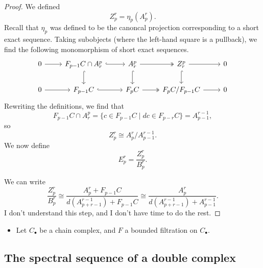 \documentclass[main.tex]{subfiles}
\begin{document}
\begin{proof}
  We defined
  \begin{equation*}
    Z^{r}_{p} = \eta_{p}(A^{r}_{p}).
  \end{equation*}
  Recall that $\eta_{p}$ was defined to be the canoncal projection corresponding to a short exact sequence. Taking subobjects (where the left-hand square is a pullback), we find the following monomorphism of short exact sequences.
  \begin{equation*}
    \begin{tikzcd}
      0
      \arrow[r]
      & F_{p-1}C \cap A^{p}_{r}
      \arrow[r, hook]
      \arrow[d, hook]
      & A^{p}_{r}
      \arrow[r, two heads]
      \arrow[d, hook]
      & Z^{p}_{r}
      \arrow[r]
      \arrow[d, hook]
      & 0
      \\
      0
      \arrow[r]
      & F_{p-1}C
      \arrow[r, hook]
      & F_{p}C
      \arrow[r, two heads]
      & F_{p}C/F_{p-1}C
      \arrow[r]
      & 0
    \end{tikzcd}
  \end{equation*}
  Rewriting the definitions, we find that
  \begin{equation*}
    F_{p-1}C \cap A^{p}_{r} = \{c \in F_{p-1}C \mid dc \in F_{p-r}C\} = A^{r-1}_{p-1},
  \end{equation*}
  so
  \begin{equation*}
    Z^{r}_{p} \cong A^{r}_{p}/A^{r-1}_{p-1}.
  \end{equation*}
  We now define
  \begin{equation*}
    E^{r}_{p} = \frac{Z^{r}_{p}}{B^{r}_{p}}.
  \end{equation*}

  We can write
  \begin{equation*}
    \frac{Z^{r}_{p}}{B^{r}_{p}} \cong \frac{A^{r}_{p} + F_{p-1}C}{d(A^{r-1}_{p+r-1}) + F_{p-1}C} \cong \frac{A^{r}_{p}}{d(A^{r-1}_{p+r-1}) + A^{r-1}_{p-1}}.
  \end{equation*}
  I don't understand this step, and I don't have time to do the rest.
\end{proof}

\begin{theorem}
  \leavevmode
  \begin{itemize}
    \item Let $C_{\bullet}$ be a chain complex, and $F$ a bounded filtration on $C_{\bullet}$.
  \end{itemize}
\end{theorem}

\subsection{The spectral sequence of a double complex}
\label{ssc:the_spectral_sequence_of_a_double_complex}
\end{document}
